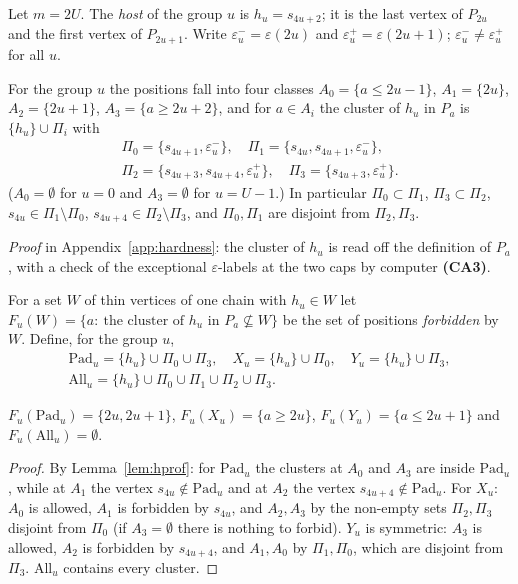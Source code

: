  Let $m=2U$. The \emph{host} of the group $u$ is $h_u=s_{4u+2}$; it is the last vertex of $P_{2u}$ and the first vertex of $P_{2u+1}$. Write $\varepsilon^-_u=\varepsilon(2u)$ and $\varepsilon^+_u=\varepsilon(2u+1)$; $\varepsilon^-_u\ne\varepsilon^+_u$ for all $u$.
\begin{lemma}\label{lem:hprof}
For the group $u$ the positions fall into four classes $A_0=\{a\le2u-1\}$, $A_1=\{2u\}$, $A_2=\{2u+1\}$, $A_3=\{a\ge 2u+2\}$, and for $a\in A_i$ the cluster of $h_u$ in $P_a$ is $\{h_u\}\cup\Pi_i$ with
\[
\begin{gathered}\Pi_0=\{s_{4u+1},\varepsilon^-_u\},\quad \Pi_1=\{s_{4u},s_{4u+1},\varepsilon^-_u\},\\ \Pi_2=\{s_{4u+3},s_{4u+4},\varepsilon^+_u\},\quad \Pi_3=\{s_{4u+3},\varepsilon^+_u\}.\end{gathered}
\]
($A_0=\emptyset$ for $u=0$ and $A_3=\emptyset$ for $u=U-1$.) In particular $\Pi_0\subset\Pi_1$, $\Pi_3\subset\Pi_2$, $s_{4u}\in\Pi_1\setminus\Pi_0$, $s_{4u+4}\in\Pi_2\setminus\Pi_3$, and $\Pi_0,\Pi_1$ are disjoint from $\Pi_2,\Pi_3$.
\end{lemma}
\emph{Proof} in Appendix~\ref{app:hardness}: the cluster of $h_u$ is read off the definition of $P_a$, with a check of the exceptional $\varepsilon$-labels at the two caps by computer \textbf{(CA3)}.

 For a set $W$ of thin vertices of one chain with $h_u\in W$ let $F_u(W)=\{a:\ \text{the cluster of }h_u\text{ in }P_a\not\subseteq W\}$ be the set of positions \emph{forbidden} by $W$. Define, for the group $u$,
\[
\begin{gathered}\mathrm{Pad}_u=\{h_u\}\cup\Pi_0\cup\Pi_3,\quad X_u=\{h_u\}\cup\Pi_0,\quad Y_u=\{h_u\}\cup\Pi_3,\\ \mathrm{All}_u=\{h_u\}\cup\Pi_0\cup\Pi_1\cup\Pi_2\cup\Pi_3 .\end{gathered}
\]
\begin{corollary}\label{cor:hforb}
$F_u(\mathrm{Pad}_u)=\{2u,2u+1\}$, $F_u(X_u)=\{a\ge2u\}$, $F_u(Y_u)=\{a\le2u+1\}$ and $F_u(\mathrm{All}_u)=\emptyset$.
\end{corollary}
\begin{proof}
By Lemma~\ref{lem:hprof}: for $\mathrm{Pad}_u$ the clusters at $A_0$ and $A_3$ are inside $\mathrm{Pad}_u$, while at $A_1$ the vertex $s_{4u}\notin\mathrm{Pad}_u$ and at $A_2$ the vertex $s_{4u+4}\notin\mathrm{Pad}_u$. For $X_u$: $A_0$ is allowed, $A_1$ is forbidden by $s_{4u}$, and $A_2,A_3$ by the non-empty sets $\Pi_2,\Pi_3$ disjoint from $\Pi_0$ (if $A_3=\emptyset$ there is nothing to forbid). $Y_u$ is symmetric: $A_3$ is allowed, $A_2$ is forbidden by $s_{4u+4}$, and $A_1,A_0$ by $\Pi_1,\Pi_0$, which are disjoint from $\Pi_3$. $\mathrm{All}_u$ contains every cluster.
\end{proof}

